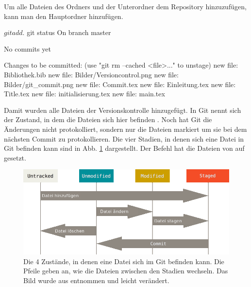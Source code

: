 Um alle Dateien des Ordners und der Unterordner dem Repository hinzuzufügen, kann man den Hauptordner hinzufügen.
%
\begin{mplisting}
$ git add .
$ git status
On branch master

No commits yet

Changes to be committed:
  (use "git rm --cached <file>..." to unstage)
	new file:   Bibliothek.bib
	new file:   Bilder/Versioncontrol.png
	new file:   Bilder/git_commit.png
	new file:   Commit.tex
	new file:   Einleitung.tex
	new file:   Title.tex
	new file:   initialisierung.tex
	new file:   main.tex

\end{mplisting}
Damit wurden alle Dateien der Versionskontrolle hinzugefügt. In Git nennt sich der Zustand, in dem die Dateien sich hier befinden . Noch hat Git die Änderungen nicht protokolliert, sondern nur die Dateien markiert um sie bei dem nächsten Commit zu protokollieren. Die vier Stadien, in denen sich eine Datei in Git befinden kann sind in Abb. \ref{fig:lifecycle} dargestellt. Der  Befehl hat die Dateien von  auf  gesetzt.
\begin{figure}[!h]
    \centering
    \includegraphics[width=\textwidth]{Bilder/lifecycle_de.png}
    \caption{Die 4 Zustände, in denen eine Datei sich im Git befinden kann. Die Pfeile geben an, wie die Dateien zwischen den Stadien wechseln. Das Bild wurde aus \cite{ProGit} entnommen und leicht verändert.}
    \label{fig:lifecycle}
\end{figure}
